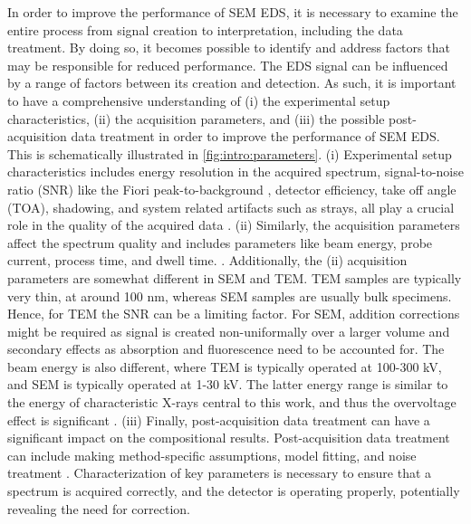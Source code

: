In order to improve the performance of SEM EDS, it is necessary to examine the entire process from signal creation to interpretation, including the data treatment.
By doing so, it becomes possible to identify and address factors that may be responsible for reduced performance.
The EDS signal can be influenced by a range of factors between its creation and detection.
As such, it is important to have a comprehensive understanding of (i) the experimental setup characteristics, (ii) the acquisition parameters, and (iii) the possible post-acquisition data treatment in order to improve the performance of SEM EDS.
This is schematically illustrated in \cref{fig:intro:parameters}.
(i) Experimental setup characteristics includes energy resolution in the acquired spectrum, signal-to-noise ratio (SNR) like the Fiori peak-to-background \cite{fiori_peak_background_1982}, detector efficiency, take off angle (TOA), shadowing, and system related artifacts such as strays, all play a crucial role in the quality of the acquired data \cite{goldstein_scanning_2018}.
(ii) Similarly, the acquisition parameters affect the spectrum quality and includes parameters like beam energy, probe current, process time, and dwell time. \cite{goldstein_scanning_2018}. %
Additionally, the (ii) acquisition parameters are somewhat different in SEM and TEM.
TEM samples are typically very thin, at around 100 nm, whereas SEM samples are usually bulk specimens.
Hence, for TEM the SNR can be a limiting factor.
For SEM, addition corrections might be required as signal is created non-uniformally over a larger volume and secondary effects as absorption and fluorescence need to be accounted for.
The beam energy is also different, where TEM is typically operated at 100-300 kV, and SEM is typically operated at 1-30 kV.
The latter energy range is similar to the energy of characteristic X-rays central to this work, and thus the overvoltage effect is significant \cite{williams_carter_companion_volume_2016}.
(iii) Finally, post-acquisition data treatment can have a significant impact on the compositional results.
Post-acquisition data treatment can include making method-specific assumptions, model fitting, and noise treatment \cite{williams_carter_companion_volume_2016}.
Characterization of key parameters is necessary to ensure that a spectrum is acquired correctly, and the detector is operating properly, potentially revealing the need for correction.



